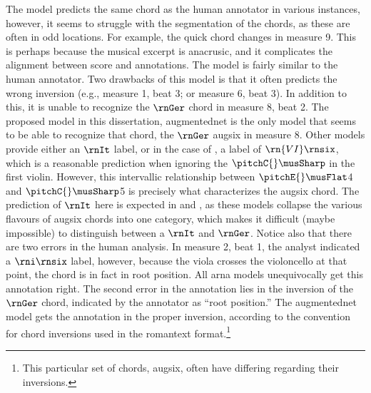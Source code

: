 The \textcite{micchi2021deep} model predicts the same chord
as the human annotator in various instances, however, it
seems to struggle with the segmentation of the chords, as
these are often in odd locations. For example, the quick
chord changes in measure 9. This is perhaps because the
musical excerpt is anacrusic, and it complicates the
alignment between score and annotations. The
\textcite{mcleod2021modular} model is fairly similar to the
human annotator. Two drawbacks of this model is that it
often predicts the wrong inversion (e.g., measure 1, beat 3;
or measure 6, beat 3). In addition to this, it is unable to
recognize the $\rnGer$ chord in measure 8, beat 2. The
proposed model in this dissertation, \gls{augmentednet} is
the only model that seems to be able to recognize that
chord, the $\rnGer$ \gls{augsix} in measure 8. Other models
provide either an $\rnIt$ label, or in the case of
\textcite{mcleod2021modular}, a label of $\rn{VI}\rnsix$,
which is a reasonable prediction when ignoring the
$\pitchC{}\musSharp$ in the first violin. However, this
intervallic relationship between $\pitchE{}\musFlat$4 and
$\pitchC{}\musSharp$5 is precisely what characterizes the
\gls{augsix} chord. The prediction of $\rnIt$ here is
expected in \textcite{chen2021attend} and
\textcite{micchi2021deep}, as these models collapse the
various flavours of \gls{augsix} chords into one category,
which makes it difficult (maybe impossible) to distinguish
between a $\rnIt$ and $\rnGer$. Notice also that there are
two errors in the human analysis. In measure 2, beat 1, the
analyst indicated a $\rni\rnsix$ label, however, because the
viola crosses the violoncello at that point, the chord is in
fact in root position. All \gls{arna} models unequivocally
get this annotation right. The second error in the
annotation lies in the inversion of the $\rnGer$ chord,
indicated by the annotator as ``root position.'' The
\gls{augmentednet} model gets the annotation in the proper
inversion, according to the convention for chord inversions
used in the \gls{romantext} format.\footnote{This particular
set of chords, \gls{augsix}, often have differing regarding
their inversions.}

